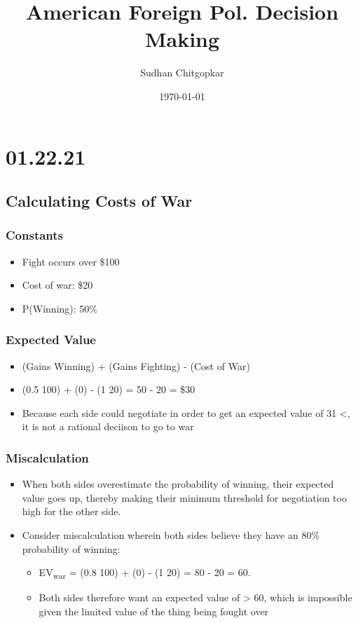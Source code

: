 \documentclass[11pt]{article}
\author{Sudhan Chitgopkar}
\date{\today}
\title{American Foreign Pol. Decision Making}
\begin{document}
\maketitle
\tableofcontents \clearpage\section{01.22.21}
\label{sec:org6bf2b66}
\subsection{Calculating Costs of War}
\label{sec:orgb41ef49}
\subsubsection{Constants}
\label{sec:org8ca7de2}
\begin{itemize}
\item Fight occurs over \$100
\item Cost of war: \$20
\item P(Winning): 50\%
\end{itemize}
\subsubsection{Expected Value}
\label{sec:orgf8887d9}
\begin{itemize}
\item (Gains Winning) + (Gains Fighting) - (Cost of War)
\item (0.5 \texttimes{} 100) + (0) - (1 \texttimes{} 20) = 50 - 20 = \$30
\item Because each side could negotiate in order to get an expected value of 31 <, it is not a rational deciison to go to war
\end{itemize}
\subsubsection{Miscalculation}
\label{sec:orgcf020a7}
\begin{itemize}
\item When both sides overestimate the probability of winning, their expected value goes up, thereby making their minimum threshold for negotiation too high for the other side.
\item Consider miscalculation wherein both sides believe they have an 80\% probability of winning:
\begin{itemize}
\item EV\textsubscript{war} = (0.8 \texttimes{} 100) + (0) - (1 \texttimes{} 20) = 80 - 20 = 60.
\item Both sides therefore want an expected value of > 60, which is impossible given the limited value of the thing being fought over
\end{itemize}
\end{itemize}
\end{document}

